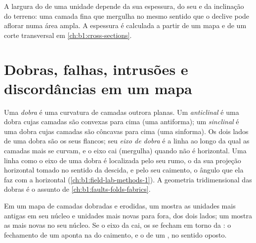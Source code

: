 \begin{remark}\label{rem:b1:geological-maps:width}
A largura do  de uma unidade depende da sua espessura, do seu  e da inclinação do terreno: uma camada fina que mergulha no mesmo sentido que o declive pode aflorar numa área ampla. A espessura é calculada a partir de um mapa e de um corte transversal em \cref{ch:b1:cross-sections}.
\end{remark}

\section{Dobras, falhas, intrusões e discordâncias em um mapa}

\begin{definition}\label{def:b1:geological-maps:fold}
Uma \emph{dobra} é uma curvatura de camadas outrora planas. Um \emph{anticlinal} é uma dobra cujas camadas são convexas para cima (uma antiforma); um \emph{sinclinal} é uma dobra cujas camadas são côncavas para cima (uma sinforma). Os dois lados de uma dobra são os seus flancos; seu \emph{eixo de dobra} é a linha ao longo da qual as camadas mais se curvam, e o eixo cai (mergulha) quando não é horizontal. Uma linha como o eixo de uma dobra é localizada pelo seu rumo, o  da sua projeção horizontal tomado no sentido da descida, e pelo seu caimento, o ângulo que ela faz com a horizontal (\cref{ch:b1:field-lab-methods-1}). A geometria tridimensional das dobras é o assunto de \cref{ch:b1:faults-folds-fabrics}.
\end{definition}

\begin{proposition}\label{prop:b1:geological-maps:folds}
Em um mapa de camadas dobradas e erodidas, um  mostra as unidades mais antigas em seu núcleo e unidades mais novas para fora, dos dois lados; um  mostra as mais novas no seu núcleo. Se o eixo da  cai, os  se fecham em torno da : o fechamento de um  aponta na  do caimento, e o de um , no sentido oposto.
\end{proposition}

